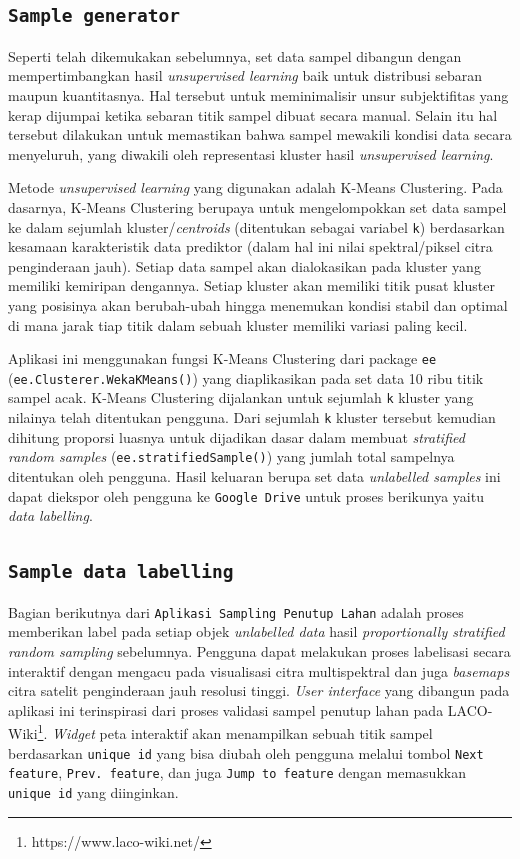 \documentclass[a4paper,12pt]{article}
\begin{document}
\subsection{\texttt{Sample generator}}
Seperti telah dikemukakan sebelumnya, set data sampel dibangun dengan mempertimbangkan hasil \textit{unsupervised learning} baik untuk distribusi sebaran maupun kuantitasnya. Hal tersebut untuk meminimalisir unsur subjektifitas yang kerap dijumpai ketika sebaran titik sampel dibuat secara manual. Selain itu hal tersebut dilakukan untuk memastikan bahwa sampel mewakili kondisi data secara menyeluruh, yang diwakili oleh representasi kluster hasil \textit{unsupervised learning}.

Metode \textit{unsupervised learning} yang digunakan adalah K-Means Clustering. Pada dasarnya, K-Means Clustering berupaya untuk mengelompokkan set data sampel ke dalam sejumlah kluster/\textit{centroids} (ditentukan sebagai variabel \texttt{k}) berdasarkan kesamaan karakteristik data prediktor (dalam hal ini nilai spektral/piksel citra penginderaan jauh). Setiap data sampel akan dialokasikan pada kluster yang memiliki kemiripan dengannya. Setiap kluster akan memiliki titik pusat kluster yang posisinya akan berubah-ubah hingga menemukan kondisi stabil dan optimal di mana jarak tiap titik dalam sebuah kluster memiliki variasi paling kecil.

Aplikasi ini menggunakan fungsi K-Means Clustering dari package \texttt{ee} (\texttt{ee.Clusterer.WekaKMeans()}) yang diaplikasikan pada set data 10 ribu titik sampel acak. K-Means Clustering dijalankan untuk sejumlah \texttt{k} kluster yang nilainya telah ditentukan pengguna. Dari sejumlah \texttt{k} kluster tersebut kemudian dihitung proporsi luasnya untuk dijadikan dasar dalam membuat \textit{stratified random samples} (\texttt{ee.stratifiedSample()}) yang jumlah total sampelnya ditentukan oleh pengguna. Hasil keluaran berupa set data \textit{unlabelled samples} ini dapat diekspor oleh pengguna ke \texttt{Google Drive} untuk proses berikunya yaitu \textit{data labelling}.

\subsection{\texttt{Sample data labelling}}
Bagian berikutnya dari \texttt{Aplikasi Sampling Penutup Lahan} adalah proses memberikan label pada setiap objek \textit{unlabelled data} hasil \textit{proportionally stratified random sampling} sebelumnya. Pengguna dapat melakukan proses labelisasi secara interaktif dengan mengacu pada visualisasi citra multispektral dan juga \textit{basemaps} citra satelit penginderaan jauh resolusi tinggi. \textit{User interface} yang dibangun pada aplikasi ini terinspirasi dari proses validasi sampel penutup lahan pada LACO-Wiki\footnote{https://www.laco-wiki.net/}. \textit{Widget} peta interaktif akan menampilkan sebuah titik sampel berdasarkan \texttt{unique id} yang bisa diubah oleh pengguna melalui tombol \texttt{Next feature}, \texttt{Prev. feature}, dan juga \texttt{Jump to feature} dengan memasukkan \texttt{unique id} yang diinginkan. 
\end{document}
